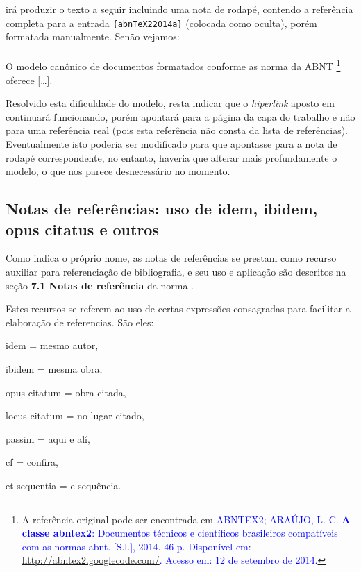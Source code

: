 \begin{apendicesenv}
irá produzir o texto a seguir incluindo uma nota de rodapé, contendo a referência completa para a entrada \verb|{abnTeX22014a}| (colocada como oculta), porém formatada manualmente. Senão vejamos:
\\
\\
O modelo canônico de documentos formatados conforme as norma da ABNT  \footnote{A referência original pode ser encontrada em \textcolor{blue}{ABNTEX2; ARA\'UJO, L. C. \textbf{A classe abntex2}: Documentos técnicos e científicos brasileiros  compatíveis com as normas abnt. [S.l.], 2014. 46 p. Disponível em: \href{https://code.google.com/p/abntex2/wiki/Download?tm=2}{http://abntex2.googlecode.com/}. Acesso em: 12 de setembro de 2014.}} oferece [\ldots].


Resolvido esta dificuldade do modelo, resta indicar que o \textit{hiperlink} aposto em  continuará funcionando, porém apontará para a página da capa do trabalho e não para uma referência real (pois esta referência não consta da lista de referências). Eventualmente isto poderia ser modificado para que apontasse para a nota de rodapé correspondente, no entanto, haveria que alterar mais profundamente o modelo, o que nos parece desnecessário no momento.



\subsection{Notas de referências: uso de idem, ibidem, opus citatus e outros}
\label{subsec:notasRefs}

Como indica o próprio nome, as notas de referências se prestam como recurso auxiliar para referenciação de bibliografia, e seu uso e aplicação são descritos na seção \textbf{7.1 Notas de referência} da norma .

Estes recursos se referem ao uso de certas expressões consagradas para facilitar a elaboração de referencias. São eles:

\begin{compactitem}
    \item idem = mesmo autor,
    \item ibidem = mesma obra,
    \item opus citatum = obra citada,
    \item locus citatum = no lugar citado,
    \item passim = aqui e alí,
    \item cf = confira,
    \item et sequentia = e sequência.
\end{compactitem}



\end{apendicesenv}
